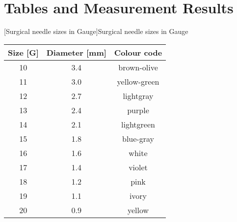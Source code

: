 

\chapter{Tables and Measurement Results}

\vspace{\fill}

\begin{center}
	[Surgical needle sizes in Gauge]{Surgical needle sizes in Gauge\footnotemark}~\\
	\label{tab_needles_gauge}
	\begin{tabular}{c c c}
	\hline
	Size [G] & Diameter [mm] & Colour code\\
	\hline
	\hline
	10 & 3.4 & brown-olive\\
	11 & 3.0 & yellow-green\\
	12 & 2.7 & lightgray\\
	13 & 2.4 & purple\\
	14 & 2.1 & lightgreen\\
	15 & 1.8 & blue-gray\\
	16 & 1.6 & white\\
	17 & 1.4 & violet\\
	18 & 1.2 & pink\\
	19 & 1.1 & ivory\\
	20 & 0.9 & yellow\\
	\hline
	\end{tabular}
\end{center}

\vspace{\fill}